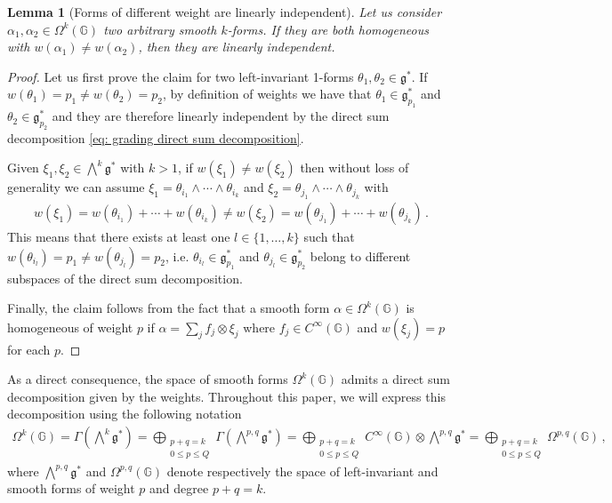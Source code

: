 \documentclass[dvipsnames]{amsart}
\newtheorem{lemma}[theorem]{Lemma}
\theoremstyle{definition}
\theoremstyle{definition}
\numberwithin{equation}{section}
\newcommand{\G}{\mathbb{G}}
\begin{document}
\begin{lemma}[Forms of different weight are linearly independent]\label{lem: different weight implies lin indep} Let us consider $\alpha_1,\alpha_2\in\Omega^k(\G)$ two arbitrary smooth $k$-forms. If they are both homogeneous with $w(\alpha_1)\neq w(\alpha_2)$, then they are linearly independent.
\end{lemma}
\begin{proof}
    Let us first prove the claim for two left-invariant 1-forms $\theta_1,\theta_2\in\mathfrak{g}^\ast$. If $w(\theta_1)=p_1\neq w(\theta_2)=p_2$, by definition of weights we have that $\theta_1\in\mathfrak{g}^\ast_{p_1}$ and $\theta_2\in\mathfrak{g}^\ast_{p_2}$ and they are therefore linearly independent by the direct sum decomposition \eqref{eq: grading direct sum decomposition}. 
    
    Given $\xi_1,\xi_2\in\bigwedge^k\mathfrak{g}^\ast$ with $k>1$, if $w(\xi_1)\neq w(\xi_2)$ then without loss of generality we can assume $\xi_1=\theta_{i_1}\wedge\cdots\wedge\theta_{i_k}$ and $\xi_2=\theta_{j_1}\wedge\cdots\wedge\theta_{j_k}$ with
    \begin{align*}
        w(\xi_1)=w(\theta_{i_1})+\cdots+w(\theta_{i_k})\neq w(\xi_2)=w(\theta_{j_1})+\cdots+w(\theta_{j_k})\,.
    \end{align*}
    This means that there exists at least one $l\in\{1,\ldots,k\}$ such that $w(\theta_{i_l})=p_1\neq w(\theta_{j_l})=p_2$, i.e. $\theta_{i_l}\in\mathfrak{g}_{p_1}^\ast$ and $\theta_{j_l}\in\mathfrak{g}_{p_2}^\ast$ belong to different subspaces of the direct sum decomposition.

    Finally, the claim follows from the fact that a smooth form $\alpha\in\Omega^k(\G)$ is homogeneous of weight $p$ if $\alpha=\sum_{j}f_j\otimes\xi_j$ where $f_j\in C^\infty(\G)$ and $w(\xi_j)=p$ for each $p$.
\end{proof}

As a direct consequence, the space of smooth forms $\Omega^k(\G)$ admits a direct sum decomposition given by the weights. Throughout this paper, we will express this decomposition using the following notation
\begin{align}
    \Omega^k(\G)=\Gamma\left(\bigwedge\nolimits^k\mathfrak{g}^\ast\right)=\bigoplus_{\substack{p+q=k\\ 0\le p\le Q}}\Gamma\left(\bigwedge\nolimits^{p,q}\mathfrak{g}^\ast\right)=\bigoplus_{\substack{p+q=k\\ 0\le p\le Q}}C^\infty(\G)\otimes\bigwedge\nolimits^{p,q}\mathfrak{g}^\ast=\bigoplus_{\substack{p+q=k\\0\le p\le Q}}\Omega^{p,q}(\G)\,,
\end{align}
where $\bigwedge^{p,q}\mathfrak{g}^\ast$ and $\Omega^{p,q}(\G)$ denote respectively the space of left-invariant and smooth forms of weight $p$ and degree $p+q=k$.
\end{document}
